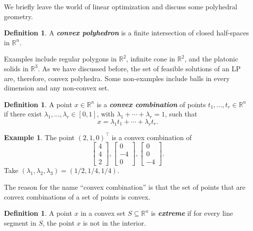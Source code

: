 \documentclass[a4paper, 12pt]{article}
\numberwithin{equation}{section}
\numberwithin{figure}{section}
\theoremstyle{definition}
\newtheorem{defn}[thm]{Definition}
\newtheorem{ex}[thm]{Example}
\newcommand{\R}{\mathbb{R}}
\newcommand{\define}[1]{\textbf{\textit{#1}}}
\begin{document}
We briefly leave the world of linear optimization and discuss some polyhedral
geometry.

\begin{defn}
	A \define{convex polyhedron} is a finite intersection of closed half-spaces
	in $\R^n$.
\end{defn}

Examples include regular polygons in $\R^2$, infinite cone in $\R^2$, and the
platonic solids in $\R^3$. As we have discussed before, the set of feasible
solutions of an LP are, therefore, convex polyhedra. Some non-examples include
balls in every dimension and any non-convex set.

\begin{defn}
	A point $x\in \R^n$ is a \define{convex combination} of points $t_1,\dots,
	t_r\in \R^n$ if there exist $\lambda_1,\dots, \lambda_r \in [0,1]$, with
	$\lambda_1 + \cdots + \lambda_r = 1$, such that 
	\[ 
		x = \lambda_1t_1 + \cdots + \lambda_rt_r. 
	\]
\end{defn}

\begin{ex}
	The point $(2,1,0)^\top$ is a convex combination of 
	\[ 
		\begin{bmatrix}
			4\\ 4 \\ 2 
		\end{bmatrix}, \begin{bmatrix}
			0 \\ -4 \\ 0
		\end{bmatrix}, \begin{bmatrix}
			0 \\ 0 \\ -4
		\end{bmatrix}. 
	\] 
	Take $(\lambda_1,\lambda_2,\lambda_3) = (1/2, 1/4, 1/4)$.
\end{ex}

The reason for the name ``convex combination'' is that the set of points that
are convex combinations of a set of points is convex.

\begin{defn}
	A point $x$ in a convex set $S\subseteq \R^n$ is \define{extreme} if for
	every line segment in $S$, the point $x$ is not in the interior. 
\end{defn}
\end{document}
